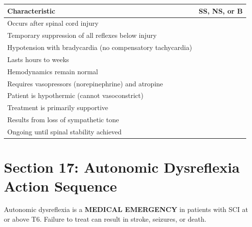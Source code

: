 \documentclass[11pt]{article}
\begin{document}
\vspace{0.5cm}

\begin{tabular}{|p{10cm}|p{3cm}|}
\hline
\textbf{Characteristic} & \textbf{SS, NS, or B} \\
\hline
Occurs after spinal cord injury & \underline{\hspace{2.5cm}} \\
\hline
Temporary suppression of all reflexes below injury & \underline{\hspace{2.5cm}} \\
\hline
Hypotension with bradycardia (no compensatory tachycardia) & \underline{\hspace{2.5cm}} \\
\hline
Lasts hours to weeks & \underline{\hspace{2.5cm}} \\
\hline
Hemodynamics remain normal & \underline{\hspace{2.5cm}} \\
\hline
Requires vasopressors (norepinephrine) and atropine & \underline{\hspace{2.5cm}} \\
\hline
Patient is hypothermic (cannot vasoconstrict) & \underline{\hspace{2.5cm}} \\
\hline
Treatment is primarily supportive & \underline{\hspace{2.5cm}} \\
\hline
Results from loss of sympathetic tone & \underline{\hspace{2.5cm}} \\
\hline
Ongoing until spinal stability achieved & \underline{\hspace{2.5cm}} \\
\hline
\end{tabular}

\vspace{1cm}

\section*{Section 17: Autonomic Dysreflexia Action Sequence}

\begin{tcolorbox}[colback=red!10!white,colframe=red!75!black,title=Critical Alert]
Autonomic dysreflexia is a \textbf{MEDICAL EMERGENCY} in patients with SCI at or above T6. Failure to treat can result in stroke, seizures, or death.
\end{tcolorbox}
\end{document}
